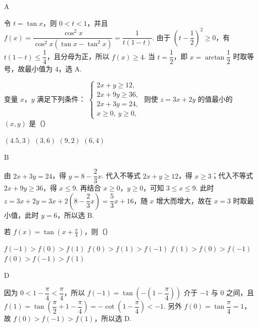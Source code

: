 \begin{answer}
A
\end{answer}

\begin{solution}
令 \(t=\tan x\)，则 \(0<t<1\)，并且
\(f(x)=\dfrac{\cos^2x}{\cos^2x(\tan x-\tan^2x)}=\dfrac{1}{t(1-t)}\). 由于 \((t-\dfrac12)^2\geqslant0\)，有 \(t(1-t)\leqslant\dfrac14\)，且分母为正，所以 \(f(x)\geqslant4\). 当 \(t=\dfrac12\)，即 \(x=\arctan\dfrac12\) 时取等号，故最小值为 \(4\)，选 A.
\end{solution}

\begin{problem}
变量 \(x\)，\(y\) 满足下列条件： \(\begin{cases}
2x + y \geqslant 12,\\
2x + 9y \geqslant 36,\\
2x + 3y = 24,\\
x \geqslant 0,\ y \geqslant 0,
\end{cases}\) 则使 \(z = 3x + 2y\) 的值最小的 \((x, y)\) 是（\quad）

\choices
    {\((4.5,3)\)}
    {\((3,6)\)}
    {\((9,2)\)}
    {\((6,4)\)}
\end{problem}

\begin{answer}
B
\end{answer}

\begin{solution}
由 \(2x+3y=24\)，得 \(y=8-\dfrac23x\). 代入不等式 \(2x+y\geqslant12\)，得 \(x\geqslant3\)；代入不等式 \(2x+9y\geqslant36\)，得 \(x\leqslant9\). 再结合 \(x\geqslant0\)，\(y\geqslant0\)，可知 \(3\leqslant x\leqslant9\). 此时 \(z=3x+2y=3x+2\left(8-\dfrac23x\right)=\dfrac53x+16\)，随 \(x\) 增大而增大，故在 \(x=3\) 时取最小值，此时 \(y=6\)，所以选 B.
\end{solution}

\begin{problem}
若 \(f(x) = \tan \left(x + \frac{\pi}{4}\right)\)，则（\quad）

\choices
    {\(f(-1) > f(0) > f(1)\)}
    {\(f(0) > f(1) > f(-1)\)}
    {\(f(1) > f(0) > f(-1)\)}
    {\(f(0) > f(-1) > f(1)\)}
\end{problem}

\begin{answer}
D
\end{answer}

\begin{solution}
因为 \(0<1-\dfrac\pi4<\dfrac\pi4\)，所以
\(f(-1)=\tan\left(-\left(1-\dfrac\pi4\right)\right)\) 介于 \(-1\) 与 \(0\) 之间，且
\(f(1)=\tan\left(\dfrac\pi2+1-\dfrac\pi4\right)=-\cot\left(1-\dfrac\pi4\right)<-1\). 另外 \(f(0)=\tan\dfrac\pi4=1\)，故 \(f(0)>f(-1)>f(1)\)，所以选 D.
\end{solution}

